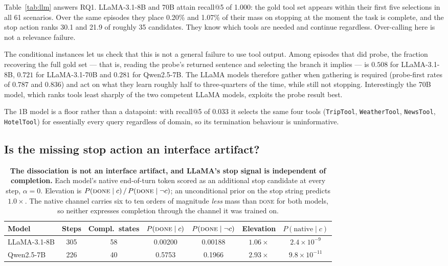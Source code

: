 \documentclass[11pt]{article}
\newcommand{\done}{\ensuremath{\text{\textsc{done}}}}
\begin{document}
Table~\ref{tab:llm} answers RQ1. LLaMA-3.1-8B and 70B attain recall@5 of 1.000:
the gold tool set appears within their first five selections in all 61 scenarios.
Over the same episodes they place 0.20\% and 1.07\% of their mass on stopping at
the moment the task is complete, and the stop action ranks 30.1 and 21.9 of
roughly 35 candidates. They know which tools are needed and continue regardless.
Over-calling here is not a relevance failure.

The conditional instances let us check that this is not a general failure to use
tool output. Among episodes that did probe, the fraction recovering the full gold
set --- that is, reading the probe's returned sentence and selecting the branch it
implies --- is $0.508$ for LLaMA-3.1-8B, $0.721$ for LLaMA-3.1-70B and $0.281$ for
Qwen2.5-7B. The LLaMA models therefore gather when gathering is required
(probe-first rates of $0.787$ and $0.836$) and act on what they learn roughly half
to three-quarters of the time, while still not stopping. Interestingly the 70B
model, which ranks tools least sharply of the two competent LLaMA models, exploits
the probe result best.

The 1B model is a floor rather than a datapoint: with recall@5 of 0.033 it selects
the same four tools (\texttt{TripTool}, \texttt{WeatherTool}, \texttt{NewsTool},
\texttt{HotelTool}) for essentially every query regardless of domain, so its
termination behaviour is uninformative.

\subsection{Is the missing stop action an interface artifact?}
\label{sec:elevation}

\begin{table}[t]
\centering
\caption{\textbf{The dissociation is not an interface artifact, and LLaMA's stop
signal is independent of completion.} Each model's native end-of-turn token scored
as an additional stop candidate at every step, $\alpha=0$. Elevation is
$P(\done\mid c)\,/\,P(\done\mid \neg c)$; an unconditional prior on the stop
string predicts $1.0\times$. The native channel carries six to ten orders of
magnitude \emph{less} mass than \textsc{done} for both models, so neither
expresses completion through the channel it was trained on.}
\label{tab:elevation}
\begin{tabular}{lcccccc}
\toprule
Model & Steps & Compl.\ states & $P(\done\mid c)$ & $P(\done\mid \neg c)$ & Elevation & $P(\text{native}\mid c)$ \\
\midrule
LLaMA-3.1-8B & 305 & 58 & 0.00200 & 0.00188 & $1.06\times$ & $2.4\times10^{-9}$ \\
Qwen2.5-7B   & 226 & 40 & 0.5753  & 0.1966  & $\mathbf{2.93\times}$ & $9.8\times10^{-11}$ \\
\bottomrule
\end{tabular}
\end{table}
\end{document}
